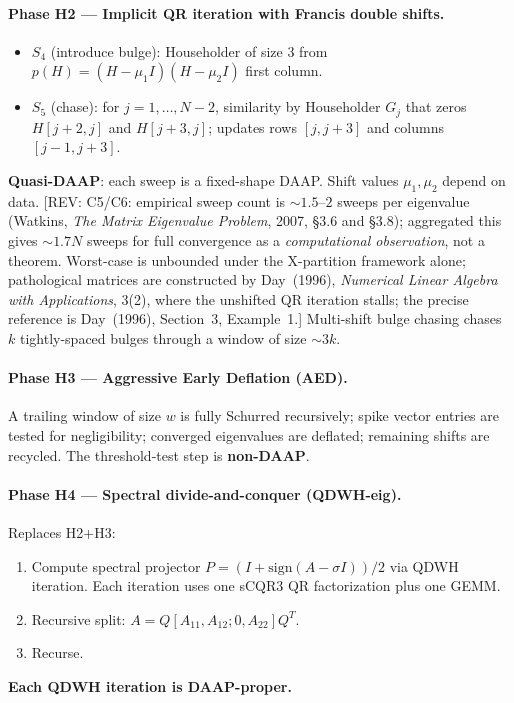 \documentclass[11pt]{article}
\newcommand{\REV}[1]{\textcolor{blue!60!black}{\small\textsf{[REV: #1]}}}
\begin{document}
\paragraph{Phase H2 --- Implicit QR iteration with Francis double shifts.}
\begin{itemize}[leftmargin=2em]
  \item $S_4$ (introduce bulge): Householder of size 3 from
    $p(H) = (H - \mu_1 I)(H - \mu_2 I)$ first column.
  \item $S_5$ (chase): for $j = 1,\ldots,N-2$, similarity by Householder
    $G_j$ that zeros $H[j+2,j]$ and $H[j+3,j]$; updates rows $[j,j+3]$
    and columns $[j-1,j+3]$.
\end{itemize}
\textbf{Quasi-DAAP}: each sweep is a fixed-shape DAAP. Shift values
$\mu_1, \mu_2$ depend on data. \REV{C5/C6: empirical sweep count is
$\sim 1.5$--$2$ sweeps per eigenvalue (Watkins, \emph{The Matrix
Eigenvalue Problem}, 2007, \S 3.6 and \S 3.8); aggregated this gives
$\sim 1.7N$ sweeps for full convergence as a \emph{computational
observation}, not a theorem. Worst-case is unbounded under the
X-partition framework alone; pathological matrices are constructed by
Day~(1996), \emph{Numerical Linear Algebra with Applications}, 3(2),
where the unshifted QR iteration stalls; the precise reference is
Day~(1996), Section~3, Example~1.} Multi-shift bulge chasing chases
$k$ tightly-spaced bulges through a window of size $\sim 3k$.

\paragraph{Phase H3 --- Aggressive Early Deflation (AED).}
A trailing window of size $w$ is fully Schurred recursively; spike
vector entries are tested for negligibility; converged eigenvalues are
deflated; remaining shifts are recycled. The threshold-test step is
\textbf{non-DAAP}.

\paragraph{Phase H4 --- Spectral divide-and-conquer (QDWH-eig).}
Replaces H2+H3:
\begin{enumerate}[leftmargin=2em]
  \item Compute spectral projector $P = (I + \mathrm{sign}(A - \sigma I))/2$
    via QDWH iteration. Each iteration uses one sCQR3 QR factorization
    plus one GEMM.
  \item Recursive split: $A = Q[A_{11}, A_{12}; 0, A_{22}]Q^T$.
  \item Recurse.
\end{enumerate}
\textbf{Each QDWH iteration is DAAP-proper.}
\end{document}
